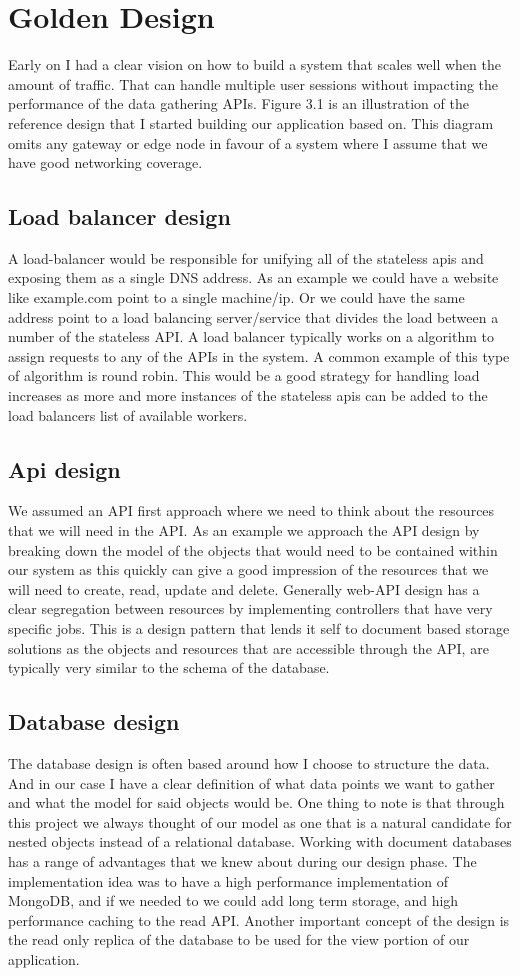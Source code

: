\documentclass[]{uiophd}
\begin{document}
\section{Golden Design}
Early on I had a clear vision on how to build a system that scales well when the amount of traffic. That can handle multiple user sessions without impacting the performance of the data gathering APIs. Figure 3.1 is an illustration of the reference design that I started building our application based on. This diagram omits any gateway or edge node in favour of a system where I assume that we have good networking coverage.
\subsection{Load balancer design}
A load-balancer would be responsible for unifying all of the stateless apis and exposing them as a single DNS address. As an example we could have a website like example.com point to a single machine/ip. Or we could have the same address point to a load balancing server/service that divides the load between a number of the stateless API. A load balancer typically works on a algorithm to assign requests to any of the APIs in the system. A common example of this type of algorithm is round robin. This would be a good strategy for handling load increases as more and more instances of the stateless apis can be added to the load balancers list of available workers.
\subsection{Api design}
We assumed an API first approach where we need to think about the resources that we will need in the API. As an example we approach the API design by breaking down the model of the objects that would need to be contained within our system as this quickly can give a good impression of the resources that we will need to create, read, update and delete. Generally web-API design has a clear segregation between resources by implementing controllers that have very specific jobs. This is a design pattern that lends it self to document based storage solutions as the objects and resources that are accessible through the API, are typically very similar to the schema of the database.
\subsection{Database design}
The database design is often based around how I choose to structure the data. And in our case I have a clear definition of what data points we want to gather and what the model for said objects would be. One thing to note is that through this project we always thought of our model as one that is a natural candidate for nested objects instead of a relational database. Working with document databases has a range of advantages that we knew about during our design phase. The implementation idea was to have a high performance implementation of MongoDB, and if we needed to we could add long term storage, and high performance caching to the read API. Another important concept of the design is the read only replica of the database to be used for the view portion of our application.
\end{document}
